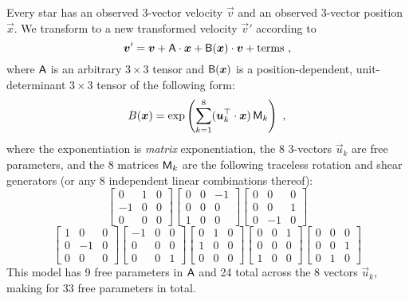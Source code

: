 \documentclass[modern]{aastex62}
\begin{document}
Every star has an observed 3-vector velocity $\vec{v}$ and an observed
3-vector position $\vec{x}$.
We transform to a new transformed velocity $\vec{v}'$ according to
\begin{equation}
  \vec{v}' = \vec{v} + \mat{A}\cdot\vec{x} + \mat{B}(\vec{x})\cdot\vec{v} + \mbox{terms}
  ~,
\end{equation}
where
$\mathsf{A}$ is an arbitrary $3\times 3$ tensor and
$\mathsf{B}(\boldsymbol{x})$ is a position-dependent, unit-determinant $3\times 3$ tensor
of the following form:
\begin{equation}
  B(\vec{x}) = \exp\left(\sum_{k=1}^8 (\vec{u}_k^\top\cdot\vec{x})\,\mat{M}_k\right)
  ~,
\end{equation}
where
the exponentiation is \emph{matrix} exponentiation,
the 8 3-vectors $\vec{u}_k$ are free parameters,
and the 8 matrices $\mathsf{M}_k$ are the following traceless rotation and shear generators (or any 8 independent linear combinations thereof):
\begin{equation}
  \begin{bmatrix} 0 & 1 & 0 \\ -1 & 0 & 0 \\ 0 & 0 & 0 \end{bmatrix}
  \begin{bmatrix} 0 & 0 & -1 \\ 0 & 0 & 0 \\ 1 & 0 & 0 \end{bmatrix}
  \begin{bmatrix} 0 & 0 & 0 \\ 0 & 0 & 1 \\ 0 & -1 & 0 \end{bmatrix}
\end{equation}
\begin{equation}
  \begin{bmatrix} 1 & 0 & 0 \\ 0 & -1 & 0 \\ 0 & 0 & 0 \end{bmatrix}
  \begin{bmatrix} -1 & 0 & 0 \\ 0 & 0 & 0 \\ 0 & 0 & 1 \end{bmatrix}
  \begin{bmatrix} 0 & 1 & 0 \\ 1 & 0 & 0 \\ 0 & 0 & 0 \end{bmatrix}
  \begin{bmatrix} 0 & 0 & 1 \\ 0 & 0 & 0 \\ 1 & 0 & 0 \end{bmatrix}
  \begin{bmatrix} 0 & 0 & 0 \\ 0 & 0 & 1 \\ 0 & 1 & 0 \end{bmatrix}
\end{equation}
This model has 9 free parameters in $\mathsf{A}$ and 24 total across
the 8 vectors $\vec{u}_k$, making for 33 free parameters in total.
\end{document}
